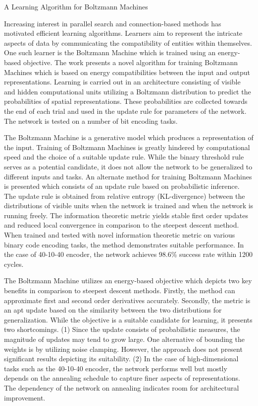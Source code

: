 \documentclass[11pt,letterpaper]{article}
\begin{document}
\begin{center}
  \large{A Learning Algorithm for Boltzmann Machines}
\end{center}


Increasing interest in parallel search and connection-based methods has motivated efficient learning algorithms. Learners aim to represent the intricate aspects of data by communicating the compatibility of entities within themselves. One such learner is the Boltzmann Machine which is trained using an energy-based objective. The work presents a novel algorithm for training Boltzmann Machines which is based on energy compatibilities between the input and output representations. Learning is carried out in an architecture consisting of visible and hidden computational units utilizing a Boltzmann distribution to predict the probabilities of spatial representations. These probabilities are collected towards the end of each trial and used in the update rule for parameters of the network. The network is tested on a number of bit encoding tasks. 

The Boltzmann Machine is a generative model which produces a representation of the input. Training of Boltzmann Machines is greatly hindered by computational speed and the choice of a suitable update rule. While the binary threshold rule serves as a potential candidate, it does not allow the network to be generalized to different inputs and tasks. An alternate method for training Boltzmann Machines is presented which consists of an update rule based on probabilistic inference. The update rule is obtained from relative entropy (KL-divergence) between the distributions of visible units when the network is trained and when the network is running freely. The information theoretic metric yields stable first order updates and reduced local convergence in comparison to the steepest descent method. When trained and tested with novel information theoretic metric on various binary code encoding tasks, the method demonstrates suitable performance. In the case of 40-10-40 encoder, the network achieves 98.6\% success rate within 1200 cycles. 

The Boltzmann Machine utilizes an energy-based objective which depicts two key benefits in comparison to steepest descent methods. Firstly, the method can approximate first and second order derivatives accurately. Secondly, the metric is an apt update based on the similarity between the two distributions for generalization. While the objective is a suitable candidate for learning, it presents two shortcomings. (1) Since the update consists of probabilistic measures, the magnitude of updates may tend to grow large. One alternative of bounding the weights is by utilizing noise clamping. However, the approach does not present significant results depicting its suitability. (2) In the case of high-dimensional tasks such as the 40-10-40 encoder, the network performs well but mostly depends on the annealing schedule to capture finer aspects of representations. The dependency of the network on annealing indicates room for architectural improvement.  
\end{document}
